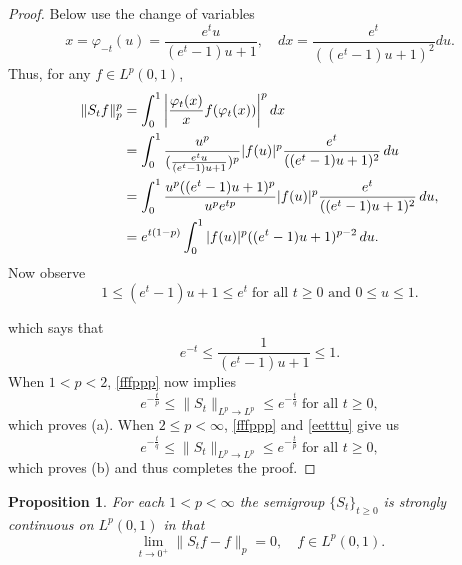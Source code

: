 \documentclass[11pt]{amsart}
\numberwithin{equation}{section}
\theoremstyle{plain}
\newtheorem{Proposition}[equation]{Proposition}
\theoremstyle{definition}
\renewcommand{\leq}{\leqslant}
\renewcommand{\geq}{\geqslant}
\renewcommand{\phi}{\varphi}
\newcommand{\0}{{\color{lightgray}0}}
\begin{document}
\begin{proof}
Below use the  change of variables 
$$x=\phi_{-t}(u)=\frac{e^tu}{(e^t-1)u+1}, \quad dx=\frac{e^t}{((e^t-1)u+1)^2}du.$$
Thus, for any $f \in L^p(0, 1)$,
\begin{align}\label{fffppp}
\|S_{t}f\|_{p}^{p} &=\int_0^1\left|\frac{\phi_t(x)}{x}f(\phi_t(x))\right|^pdx\\\notag
&=
\int_0^1\frac{u^p}{(\frac{e^tu}{(e^t-1)u+1})^p}|f(u)|^p\frac{e^t}{((e^t-1)u+1)^2}\,du\\\notag
&=\int_0^1\frac{u^p((e^t-1)u+1)^p}{u^pe^{tp}}|f(u)|^p\frac{e^t}{((e^t-1)u+1)^2}\,du,\\\notag
&=e^{t(1-p)}\int_0^1|f(u)|^p ((e^t-1)u+1)^{p-2}\,du.\label{fffppp}
\end{align}
Now observe 
\begin{equation}\label{eetttu}
1\leq (e^t-1)u+1\leq e^t \; \text{for all $t \geq 0$ and $0 \leq u \leq 1$}.
\end{equation}



which says that 
\begin{equation}\label{uuuCvv}
e^{-t}\leq \frac{1}{(e^t-1)u+1}\leq 1.
\end{equation}
When $1<p<2$,   \eqref{fffppp}  now implies 
$$
e^{-\frac{t}{p}}\leq \|S_t\|_{L^p \to L^p} \leq e^{-\frac{t}{q}} \; \mbox{for all $t \geq 0$},
$$
which proves (a).
When $2 \leq p<\infty$,  \eqref{fffppp} and  \eqref{eetttu} give us 
$$
e^{-\frac{t}{q}}\leq \|S_t\|_{L^p \to L^p}\leq e^{-\frac{t}{p}} \; \mbox{for all $t \geq 0$},
$$ 
which proves (b) and thus completes the proof. 
\end{proof}

\begin{Proposition}
For each $1 < p < \infty$ the semigroup $\{S_t\}_{t \geq 0}$ is strongly continuous on $L^p(0, 1)$ in that 
$$\lim_{t \to 0^{+}} \|S_t f - f\|_{p} = 0, \quad f \in L^p(0, 1).$$
\end{Proposition}
\end{document}
